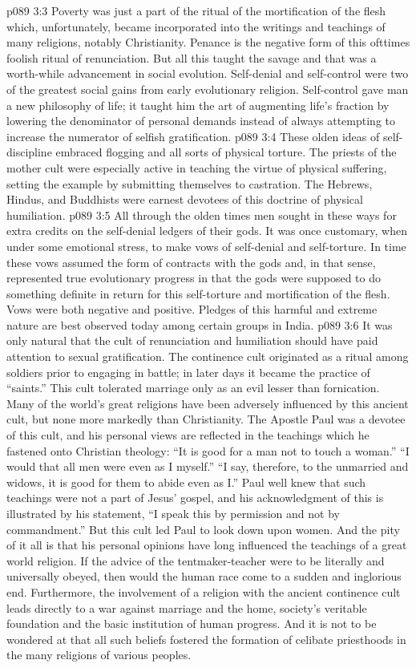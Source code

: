 \vs p089 3:3 Poverty was just a part of the ritual of the mortification of the flesh which, unfortunately, became incorporated into the writings and teachings of many religions, notably Christianity. Penance is the negative form of this ofttimes foolish ritual of renunciation. But all this taught the savage  and that was a worth\hyp{}while advancement in social evolution. Self\hyp{}denial and self\hyp{}control were two of the greatest social gains from early evolutionary religion. Self\hyp{}control gave man a new philosophy of life; it taught him the art of augmenting life’s fraction by lowering the denominator of personal demands instead of always attempting to increase the numerator of selfish gratification.
\vs p089 3:4 These olden ideas of self\hyp{}discipline embraced flogging and all sorts of physical torture. The priests of the mother cult were especially active in teaching the virtue of physical suffering, setting the example by submitting themselves to castration. The Hebrews, Hindus, and Buddhists were earnest devotees of this doctrine of physical humiliation.
\vs p089 3:5 All through the olden times men sought in these ways for extra credits on the self\hyp{}denial ledgers of their gods. It was once customary, when under some emotional stress, to make vows of self\hyp{}denial and self\hyp{}torture. In time these vows assumed the form of contracts with the gods and, in that sense, represented true evolutionary progress in that the gods were supposed to do something definite in return for this self\hyp{}torture and mortification of the flesh. Vows were both negative and positive. Pledges of this harmful and extreme nature are best observed today among certain groups in India.
\pc \vs p089 3:6 It was only natural that the cult of renunciation and humiliation should have paid attention to sexual gratification. The continence cult originated as a ritual among soldiers prior to engaging in battle; in later days it became the practice of “saints.” This cult tolerated marriage only as an evil lesser than fornication. Many of the world’s great religions have been adversely influenced by this ancient cult, but none more markedly than Christianity. The Apostle Paul was a devotee of this cult, and his personal views are reflected in the teachings which he fastened onto Christian theology: “It is good for a man not to touch a woman.” “I would that all men were even as I myself.” “I say, therefore, to the unmarried and widows, it is good for them to abide even as I.” Paul well knew that such teachings were not a part of Jesus’ gospel, and his acknowledgment of this is illustrated by his statement, “I speak this by permission and not by commandment.” But this cult led Paul to look down upon women. And the pity of it all is that his personal opinions have long influenced the teachings of a great world religion. If the advice of the tentmaker\hyp{}teacher were to be literally and universally obeyed, then would the human race come to a sudden and inglorious end. Furthermore, the involvement of a religion with the ancient continence cult leads directly to a war against marriage and the home, society’s veritable foundation and the basic institution of human progress. And it is not to be wondered at that all such beliefs fostered the formation of celibate priesthoods in the many religions of various peoples.
